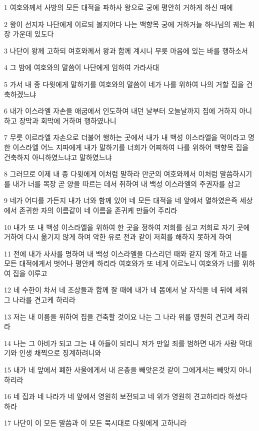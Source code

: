 \par 1 여호와께서 사방의 모든 대적을 파하사 왕으로 궁에 평안히 거하게 하신 때에
\par 2 왕이 선지자 나단에게 이르되 볼지어다 나는 백향목 궁에 거하거늘 하나님의 궤는 휘장 가운데 있도다
\par 3 나단이 왕께 고하되 여호와께서 왕과 함께 계시니 무릇 마음에 있는 바를 행하소서
\par 4 그 밤에 여호와의 말씀이 나단에게 임하여 가라사대
\par 5 가서 내 종 다윗에게 말하기를 여호와의 말씀이 네가 나를 위하여 나의 거할 집을 건축하겠느냐
\par 6 내가 이스라엘 자손을 애굽에서 인도하여 내던 날부터 오늘날까지 집에 거하지 아니하고 장막과 회막에 거하며 행하였나니
\par 7 무릇 이르라엘 자손으로 더불어 행하는 곳에서 내가 내 백성 이스라엘을 먹이라고 명한 이스라엘 어느 지파에게 내가 말하기를 너희가 어찌하여 나를 위하어 백향목 집을 건축하지 아니하였느냐고 말하였느냐
\par 8 그러므로 이제 내 종 다윗에게 이처럼 말하라 만군의 여호와께서 이처럼 말씀하시기를 내가 너를 목장 곧 양을 따르는 데서 취하여 내 백성 이스라엘의 주권자를 삼고
\par 9 네가 어디를 가든지 내가 너와 함께 있어 네 모든 대적을 네 앞에서 멸하였은즉 세상에서 존귀한 자의 이름같이 네 이름을 존귀케 만들어 주리라
\par 10 내가 또 내 백성 이스라엘을 위하여 한 곳을 정하여 저희를 심고 저희로 자기 곳에 거하여 다시 옮기지 않게 하며 악한 유로 전과 같이 저희를 해하지 못하게 하여
\par 11 전에 내가 사사를 명하여 내 백성 이스라엘을 다스리던 때와 같지 않게 하고 너를 모든 대적에게서 벗어나 평안케 하리라 여호와가 또 네게 이르노니 여호와가 너를 위하여 집을 이루고
\par 12 네 수한이 차서 네 조상들과 함께 잘 때에 내가 네 몸에서 날 자식을 네 뒤에 세워 그 나라를 견고케 하리라
\par 13 저는 내 이름을 위하여 집을 건축할 것이요 나는 그 나라 위를 영원히 견고케 하리라
\par 14 나는 그 아비가 되고 그는 내 아들이 되리니 저가 만일 죄를 범하면 내가 사람 막대기와 인생 채찍으로 징계하려니와
\par 15 내가 네 앞에서 폐한 사울에게서 내 은총을 빼앗은것 같이 그에게서는 빼앗지 아니하리라
\par 16 네 집과 네 나라가 네 앞에서 영원히 보전되고 네 위가 영원히 견고하리라 하셨다 하라
\par 17 나단이 이 모든 말씀과 이 모든 묵시대로 다윗에게 고하니라
